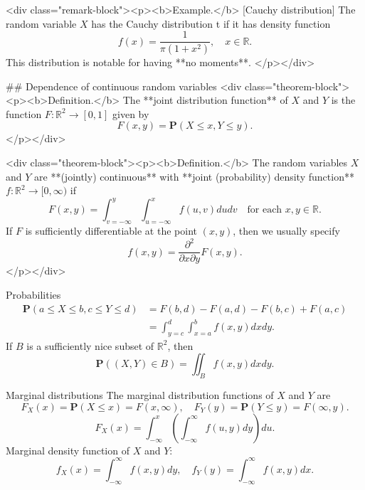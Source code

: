 <div class="remark-block"><p><b>Example.</b> [Cauchy distribution] The random variable $X$ has the Cauchy distribution t if it has density 
function 
$$\begin{equation}
    f(x) = \frac{1}{\pi (1+x^2)}, \quad x \in \mathbb{R}.
\end{equation}$$
This distribution is notable for having **no moments**.
</p></div>

## Dependence of continuous random variables
<div class="theorem-block"><p><b>Definition.</b> 
The **joint distribution function** of $X$ and $Y$ is the function $F: \mathbb{R}^2 \to [0, 1]$ given by 
$$\begin{equation}
    F(x,y) = \mathbf{P}(X\leq x, Y \leq y).
\end{equation}$$
</p></div>

<div class="theorem-block"><p><b>Definition.</b> 
The random variables $X$ and $Y$ are **(jointly) continuous** with **joint (probability) density function** $f : \mathbb{R}^2 \to [0, \infty)$ if
$$\begin{equation}
    F(x, y)=\int_{v=-\infty}^{y} \int_{u=-\infty}^{x} f(u, v) d u d v \quad \text{for each } x, y\in\mathbb{R}. 
\end{equation}$$
If $F$ is sufficiently differentiable at the point $(x , y)$, then we usually specify 
$$\begin{equation}
    f(x, y)=\frac{\partial^{2}}{\partial x \partial y} F(x, y).
\end{equation}$$
</p></div>

\begin{newnotion}{Probabilities}
$$\begin{equation}
    \begin{aligned} 
        \mathbf{P}(a \leq X \leq b, c \leq Y \leq d) &=F(b, d)-F(a, d)-F(b, c)+F(a, c) \\ 
        &=\int_{y=c}^{d} \int_{x=a}^{b} f(x, y) d x d y. \end{aligned}
\end{equation}$$
If $B$ is a sufficiently nice subset of $\mathbb{R}^2$, then
$$\begin{equation}
    \mathbf{P} \left( (X, Y) \in B \right)=\iint_{B} f(x, y) d x d y.
\end{equation}$$
\end{newnotion}
\begin{newnotion}{Marginal distributions}
The marginal distribution functions of $X$ and $Y$ are
$$\begin{equation}
    F_{X}(x)=\mathbf{P}(X \leq x)=F(x, \infty), \quad F_{Y}(y)=\mathbf{P}(Y \leq y)=F(\infty, y). 
\end{equation}$$
$$\begin{equation}
    F_{X}(x)=\int_{-\infty}^{x}\left(\int_{-\infty}^{\infty} f(u, y) d y\right) d u.
\end{equation}$$
Marginal density function of $X$ and $Y$:
$$\begin{equation}
    f_{X}(x)=\int_{-\infty}^{\infty} f(x, y) d y, \quad f_{Y}(y)=\int_{-\infty}^{\infty} f(x, y) d x.
\end{equation}$$
\end{newnotion}

